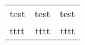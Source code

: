 \documentclass[png={density=1200}]{standalone}
\begin{document}
\begin{sideways}
\begin{tabular}{lrr}
test & test & test\\
tttt & tttt & tttt\\
\end{tabular}
\end{sideways}
\end{document}
